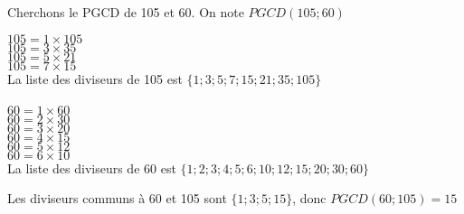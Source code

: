 
Cherchons le PGCD de 105 et 60. On note
 $PGCD(105;60)$
\begin{multicols}{2}
$105=1 \times 105$\\
$105=3 \times 35$\\
$105=5 \times 21$\\
$105=7 \times 15$\\
La liste des diviseurs de 105 est $\lbrace 1;3;5;7;15;21;35;105 \rbrace$\\
\columnbreak
\\
$60=1 \times 60$\\
$60=2 \times 30$\\
$60=3 \times 20$\\
$60=4 \times 15$\\
$60=5 \times 12$\\
$60=6 \times 10$\\
La liste des diviseurs de 60 est $\lbrace 1;2;3;4;5;6;10;12;15;20;30;60 \rbrace$
\end{multicols}
Les diviseurs communs à 60 et 105 sont $\lbrace 1;3;5;15 \rbrace$, donc $PGCD(60;105)=15$